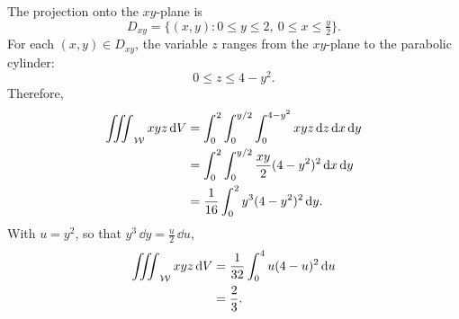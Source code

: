 \begin{sol}
The projection onto the $xy$-plane is
\[
    D_{xy}
    = \{(x,y):0 \leq y \leq 2,\ 0 \leq x \leq \tfrac{y}{2}\}.
\]
For each $(x,y)\in D_{xy}$, the variable $z$ ranges from the $xy$-plane to the parabolic cylinder:
\[
    0 \leq z \leq 4 - y^2.
\]
Therefore,
\begin{align*}
    \mathop{\int\mkern-10mu\int\mkern-10mu\int}\nolimits_{\mathcal{W}} xyz \, \mathrm{d}V
    &= \int_0^2\int_0^{y/2}\int_0^{4 - y^2}
    xyz\,\mathrm{d}z\,\mathrm{d}x\,\mathrm{d}y\\
    &= \int_0^2\int_0^{y/2}
    \frac{xy}{2}(4 - y^2)^2\,\mathrm{d}x\,\mathrm{d}y\\
    &= \frac{1}{16}\int_0^2y^3(4 - y^2)^2\,\mathrm{d}y.
\end{align*}
With $u = y^2$, so that $y^3\,\dd{y} = \frac{u}{2}\,\dd{u}$,
\begin{align*}
    \mathop{\int\mkern-10mu\int\mkern-10mu\int}\nolimits_{\mathcal{W}} xyz \, \mathrm{d}V
    &= \frac{1}{32}\int_0^4u(4 - u)^2\,\mathrm{d}u\\
    &= \frac{2}{3}.
\end{align*}
\end{sol}
